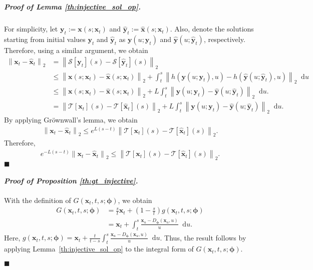 \documentclass{article} \usepackage{iclr2024_coNFErence,times}
\newcommand{\norm}[1]{\left\lVert#1\right\rVert}
\newenvironment{myproof}[2]{\paragraph{\textit{Proof of {#1} {#2}. }}}{\hfill$\blacksquare$}
\theoremstyle{definition}
\theoremstyle{remark}
\newcommand*\diff{\mathop{}\!\mathrm{d}}
\begin{document}
\begin{myproof}{Lemma}{\ref{th:injective_sol_op}}
\begin{align*}
    \end{align*}
    For simplicity, let $\mathbf{y}_t := \mathbf{x}(s; \mathbf{x}_t)$ and $\hat{\mathbf{y}}_t := \hat{\mathbf{x}}(s; \mathbf{x}_t)$. Also, denote the solutions starting from initial values $\mathbf{y}_t$ and $\hat{\mathbf{y}}_t$ as $\mathbf{y}(u;\mathbf{y}_t)$ and  $\hat{\mathbf{y}}(u;\hat{\mathbf{y}}_t)$, respectively.
    Therefore, using a similar argument, we obtain
    \begin{align*}
       \norm{\mathbf{x}_t-\hat{\mathbf{x}}_t}_2 
       &=\norm{\mathcal{S}[\mathbf{y}_t](s) -\mathcal{S}[\hat{\mathbf{y}}_t](s)}_2 \nonumber
       \\& \leq \norm{\mathbf{x}(s;\mathbf{x}_t)-\hat{\mathbf{x}}(s;\mathbf{x}_t)}_2+ \int_{t}^{s}\norm{h(\mathbf{y}(u;\mathbf{y}_t),u)-h(\hat{\mathbf{y}}(u;\hat{\mathbf{y}}_t),u)}_2\diff u \nonumber
       \\& \leq \norm{\mathbf{x}(s;\mathbf{x}_t)-\hat{\mathbf{x}}(s;\mathbf{x}_t)}_2 + L\int_{t}^{s}\norm{\mathbf{y}(u;\mathbf{y}_t)-\hat{\mathbf{y}}(u;\hat{\mathbf{y}}_t)}_2\diff u. \nonumber
       \\& = \norm{\mathcal{T}[\mathbf{x}_t](s) -\mathcal{T}[\hat{\mathbf{x}}_t](s)}_2 + L\int_{t}^{s}\norm{\mathbf{y}(u;\mathbf{y}_t)-\hat{\mathbf{y}}(u;\hat{\mathbf{y}}_t)}_2\diff u. \nonumber
   \end{align*}    
    By applying Gr\"ownwall's lemma, we obtain 
    \begin{align*}
       \norm{\mathbf{x}_t-\hat{\mathbf{x}}_t}_2 \leq e^{L(s-t)}\norm{\mathcal{T}[\mathbf{x}_t](s) -\mathcal{T}[\hat{\mathbf{x}}_t](s)}_2. 
   \end{align*}        
    Therefore, 
    \begin{align*} 
       e^{-L(s-t)}\norm{\mathbf{x}_t-\hat{\mathbf{x}}_t}_2 \leq \norm{\mathcal{T}[\mathbf{x}_t](s) -\mathcal{T}[\hat{\mathbf{x}}_t](s)}_2. 
   \end{align*}   
\end{myproof}

\begin{myproof}{Proposition}{\ref{th:gt_injective}} With the definition of $G(\mathbf{x}_t, t, s; \bm{\phi})$, we obtain
\begin{align*}
    G(\mathbf{x}_t, t, s; \bm{\phi})
    &=\frac{s}{t}\mathbf{x}_t + (1-\frac{s}{t})g(\mathbf{x}_t, t, s;\bm{\phi})
    \\&=\mathbf{x}_{t}+ \int_{t}^{s}\frac{\mathbf{x}_{{u}}-D_{\bm{\phi}}(\mathbf{x}_{u},{u}) }{{u}}\diff u.
\end{align*}
Here, $g(\mathbf{x}_{t},t,s;\bm{\phi})=\mathbf{x}_{t}+\frac{t}{t-s}\int_{t}^{s}\frac{\mathbf{x}_{{u}}-D_{\bm{\phi}}(\mathbf{x}_{u},{u}) }{{u}}\diff u$. Thus, the result follows by applying Lemma~\ref{th:injective_sol_op} to the integral form of $G(\mathbf{x}_t, t, s; \bm{\phi})$.

\end{myproof}
\end{document}
